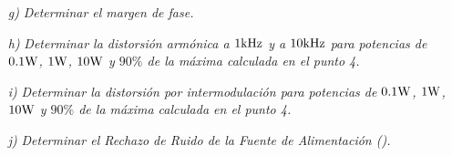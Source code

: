 {\begin{enumerate}
\item[\textit{g)}] \textit{Determinar el margen de fase.}
\item[\textit{h)}] \textit{Determinar la distorsión armónica a $1 \si[per-mode=symbol]{\kilo\hertz}$ y a $10 \si[per-mode=symbol]{\kilo\hertz}$ para potencias de $0.1 \si[per-mode=symbol]{\watt}$, $1 \si[per-mode=symbol]{\watt}$, $10 \si[per-mode=symbol]{\watt}$ y $90\%$ de la máxima calculada en el punto 4.}
\item[\textit{i)}] \textit{Determinar la distorsión por intermodulación para potencias de $0.1 \si[per-mode=symbol]{\watt}$, $1 \si[per-mode=symbol]{\watt}$, $10 \si[per-mode=symbol]{\watt}$ y $90\%$ de la máxima calculada en el punto 4.}
\item[\textit{j)}] \textit{Determinar el Rechazo de Ruido de la Fuente de Alimentación (\mbox{}).}
\end{enumerate}
}



